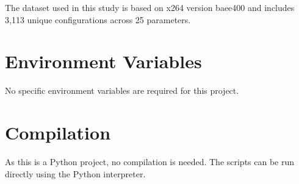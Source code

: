\documentclass[10pt]{article}
\begin{document}
The dataset used in this study is based on x264 version baee400 and includes 3,113 unique configurations across 25 parameters.

\section{Environment Variables}
No specific environment variables are required for this project.

\section{Compilation}
As this is a Python project, no compilation is needed. The scripts can be run directly using the Python interpreter.
\end{document}
